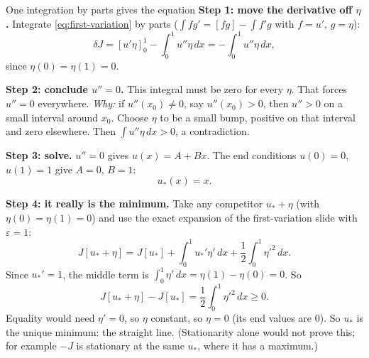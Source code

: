 \documentclass[11pt]{beamer}
\newcommand{\dd}{\,d}
\begin{document}
\begin{frame}[allowframebreaks=1.00]{One integration by parts gives the equation}
\small
\textbf{Step 1: move the derivative off \(\eta\).} Integrate \eqref{eq:first-variation} by parts
(\(\int fg'=[fg]-\int f'g\) with \(f=u'\), \(g=\eta\)):
\[
 \delta J=[u'\eta]_0^1-\int_0^1u''\eta\dd x
          =-\int_0^1u''\eta\dd x,
\]
since \(\eta(0)=\eta(1)=0\).

\textbf{Step 2: conclude \(u''=0\).} This integral must be zero for every \(\eta\). That forces \(u''=0\)
everywhere. \emph{Why:} if \(u''(x_0)\ne0\), say \(u''(x_0)>0\), then \(u''>0\) on a small interval around \(x_0\).
Choose \(\eta\) to be a small bump, positive on that interval and zero elsewhere. Then \(\int u''\eta\,dx>0\), a
contradiction.

\textbf{Step 3: solve.} \(u''=0\) gives \(u(x)=A+Bx\). The end conditions \(u(0)=0\), \(u(1)=1\) give \(A=0\), \(B=1\):
\[
 u_*(x)=x .
\]
\par\framebreak\par
\textbf{Step 4: it really is the minimum.} Take any competitor \(u_*+\eta\) (with \(\eta(0)=\eta(1)=0\)) and use
the exact expansion of the first-variation slide with \(\varepsilon=1\):
\[
 J[u_*+\eta]=J[u_*]+\int_0^1u_*'\eta'\dd x+\frac12\int_0^1\eta'^2\dd x .
\]
Since \(u_*'=1\), the middle term is \(\int_0^1\eta'\dd x=\eta(1)-\eta(0)=0\). So
\begin{equation}
 J[u_*+\eta]-J[u_*]=\frac12\int_0^1\eta'^2\dd x\ge0.\label{eq:line-minimum}
\end{equation}
Equality would need \(\eta'=0\), so \(\eta\) constant, so \(\eta=0\) (its end values are \(0\)). So \(u_*\) is the unique
minimum: the straight line. (Stationarity alone would not prove this; for example \(-J\) is stationary at
the same \(u_*\), where it has a maximum.)
\end{frame}
\end{document}
